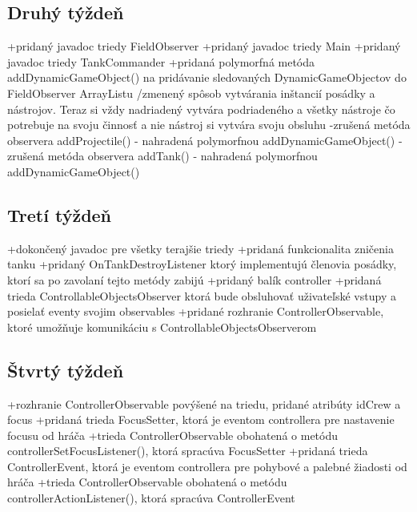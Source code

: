 \documentclass[12pt,oneside,slovak,a4paper]{article}
\begin{document}
\subsection{Druhý týždeň}
+pridaný javadoc triedy FieldObserver\newline
+pridaný javadoc triedy Main\newline
+pridaný javadoc triedy TankCommander\newline
+pridaná polymorfná metóda addDynamicGameObject() na pridávanie sledovaných DynamicGameObjectov do FieldObserver ArrayListu\newline
\newline
/zmenený spôsob vytvárania inštancií posádky a nástrojov. Teraz si vždy nadriadený vytvára podriadeného a všetky nástroje čo potrebuje na svoju činnosť a nie nástroj si vytvára svoju obsluhu\newline
\newline
-zrušená metóda observera addProjectile() - nahradená polymorfnou addDynamicGameObject()\newline
-zrušená metóda observera addTank() - nahradená polymorfnou addDynamicGameObject()\newline
\subsection{Tretí týždeň}
+dokončený javadoc pre všetky terajšie triedy\newline
+pridaná funkcionalita zničenia tanku\newline
+pridaný OnTankDestroyListener ktorý implementujú členovia posádky, ktorí sa po zavolaní tejto metódy zabijú\newline
+pridaný balík controller\newline
+pridaná trieda ControllableObjectsObserver ktorá bude obsluhovať uživateľské vstupy a posielať eventy svojim observables\newline
+pridané rozhranie ControllerObservable, ktoré umožňuje komunikáciu s ControllableObjectsObserverom\newline
\subsection{Štvrtý týždeň}
+rozhranie ControllerObservable povýšené na triedu, pridané atribúty idCrew a focus\newline
+pridaná trieda FocusSetter, ktorá je eventom controllera pre nastavenie focusu od hráča\newline
+trieda ControllerObservable obohatená o metódu controllerSetFocusListener(), ktorá spracúva FocusSetter\newline
+pridaná trieda ControllerEvent, ktorá je eventom controllera pre pohybové a palebné žiadosti od hráča\newline
+trieda ControllerObservable obohatená o metódu controllerActionListener(), ktorá spracúva ControllerEvent\newline
\end{document}

